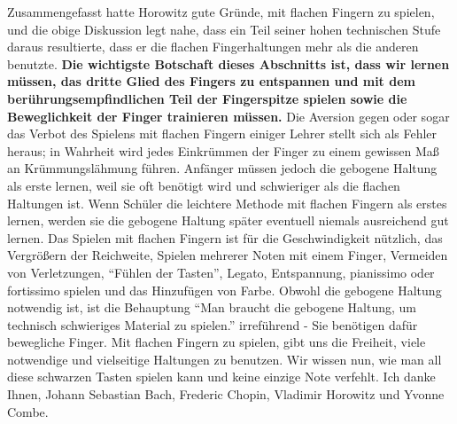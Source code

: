 Zusammengefasst hatte Horowitz gute Gründe, mit flachen Fingern zu spielen, und die obige Diskussion legt nahe, dass ein Teil seiner hohen technischen Stufe daraus resultierte, dass er die flachen Fingerhaltungen mehr als die anderen benutzte.
\textbf{Die wichtigste Botschaft dieses Abschnitts ist, dass wir lernen müssen, das dritte Glied des Fingers zu entspannen und mit dem berührungsempfindlichen Teil der Fingerspitze spielen sowie die Beweglichkeit der Finger trainieren müssen.}
Die Aversion gegen oder sogar das Verbot des Spielens mit flachen Fingern einiger Lehrer stellt sich als Fehler heraus; in Wahrheit wird jedes Einkrümmen der Finger zu einem gewissen Maß an Krümmungslähmung führen.
Anfänger müssen jedoch die gebogene Haltung als erste lernen, weil sie oft benötigt wird und schwieriger als die flachen Haltungen ist.
Wenn Schüler die leichtere Methode mit flachen Fingern als erstes lernen, werden sie die gebogene Haltung später eventuell niemals ausreichend gut lernen.
Das Spielen mit flachen Fingern ist für die Geschwindigkeit nützlich, das Vergrößern der Reichweite, Spielen mehrerer Noten mit einem Finger, Vermeiden von Verletzungen, \enquote{Fühlen der Tasten}, Legato, Entspannung, pianissimo oder fortissimo spielen und das Hinzufügen von Farbe.
Obwohl die gebogene Haltung notwendig ist, ist die Behauptung \enquote{Man braucht die gebogene Haltung, um technisch schwieriges Material zu spielen.} irreführend - Sie benötigen dafür bewegliche Finger.
Mit flachen Fingern zu spielen, gibt uns die Freiheit, viele notwendige und vielseitige Haltungen zu benutzen.
Wir wissen nun, wie man all diese schwarzen Tasten spielen kann und keine einzige Note verfehlt.
Ich danke Ihnen, Johann Sebastian Bach, Frederic Chopin, Vladimir Horowitz und Yvonne Combe.



